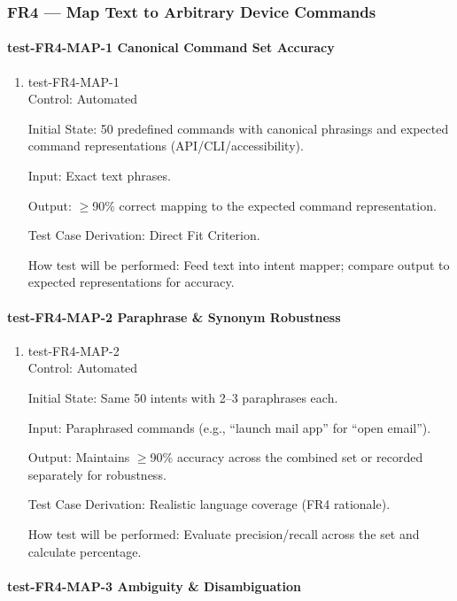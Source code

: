 \documentclass[12pt, titlepage]{article}
\begin{document}
\subsubsection{FR4 — Map Text to Arbitrary Device Commands}

\paragraph{test-FR4-MAP-1 Canonical Command Set Accuracy}

\begin{enumerate}
\item{test-FR4-MAP-1\\}
Control: Automated

Initial State: 50 predefined commands with canonical phrasings and expected command representations (API/CLI/accessibility).

Input: Exact text phrases.

Output: $\geq$90\% correct mapping to the expected command representation.

Test Case Derivation: Direct Fit Criterion.

How test will be performed: Feed text into intent mapper; compare output to expected representations for accuracy.
\end{enumerate}

\paragraph{test-FR4-MAP-2 Paraphrase \& Synonym Robustness}

\begin{enumerate}
\item{test-FR4-MAP-2\\}
Control: Automated

Initial State: Same 50 intents with 2–3 paraphrases each.

Input: Paraphrased commands (e.g., “launch mail app” for “open email”).

Output: Maintains $\geq$90\% accuracy across the combined set or recorded separately for robustness.

Test Case Derivation: Realistic language coverage (FR4 rationale).

How test will be performed: Evaluate precision/recall across the set and calculate percentage.
\end{enumerate}

\paragraph{test-FR4-MAP-3 Ambiguity \& Disambiguation}
\end{document}
